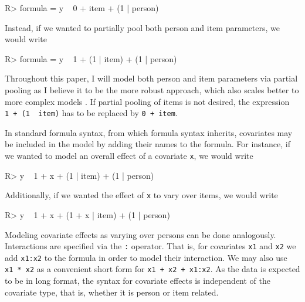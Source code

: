 \documentclass[jss]{jss}
\begin{document}
\begin{CodeChunk}

\begin{CodeInput}
R> formula = y ~ 0 + item + (1 | person)
\end{CodeInput}
\end{CodeChunk}

Instead, if we wanted to partially pool both person and item parameters,
we would write

\begin{CodeChunk}

\begin{CodeInput}
R> formula = y ~ 1 + (1 | item) + (1 | person)
\end{CodeInput}
\end{CodeChunk}

Throughout this paper, I will model both person and item parameters via
partial pooling as I believe it to be the more robust approach, which
also scales better to more complex models \citep{gelmanMLM2006}. If
partial pooling of items is not desired, the expression
\texttt{1\ +\ (1\ \textbar{}\ item)} has to be replaced by
\texttt{0\ +\ item}.

In standard  formula syntax, from which  formula
syntax inherits, covariates may be included in the model by adding their
names to the formula. For instance, if we wanted to model an overall
effect of a covariate \texttt{x}, we would write

\begin{CodeChunk}

\begin{CodeInput}
R> y ~ 1 + x + (1 | item) + (1 | person)
\end{CodeInput}
\end{CodeChunk}

Additionally, if we wanted the effect of \texttt{x} to vary over items,
we would write

\begin{CodeChunk}

\begin{CodeInput}
R> y ~ 1 + x + (1 + x | item) + (1 | person)
\end{CodeInput}
\end{CodeChunk}

Modeling covariate effects as varying over persons can be done
analogously. Interactions are specified via the \texttt{:} operator.
That is, for covariates \texttt{x1} and \texttt{x2} we add
\texttt{x1:x2} to the formula in order to model their interaction. We
may also use \texttt{x1\ *\ x2} as a convenient short form for
\texttt{x1\ +\ x2\ +\ x1:x2}. As the data is expected to be in long
format, the syntax for covariate effects is independent of the covariate
type, that is, whether it is person or item related.
\end{document}
